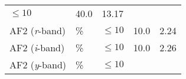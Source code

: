 \documentclass[DM,toc]{lsstdoc}
\begin{document}
\begin{longtable}[]{@{}lllll@{}}
\begin{minipage}[t]{0.20\columnwidth}
\(\leq 10\)\strut
\end{minipage} & \begin{minipage}[t]{0.22\columnwidth}\raggedright\strut
40.0\strut
\end{minipage} & \begin{minipage}[t]{0.17\columnwidth}\raggedright\strut
13.17\strut
\end{minipage}\tabularnewline
\begin{minipage}[t]{0.19\columnwidth}\raggedright\strut
AF2 (\emph{r}-band)\strut
\end{minipage} & \begin{minipage}[t]{0.08\columnwidth}\raggedright\strut
\%\strut
\end{minipage} & \begin{minipage}[t]{0.20\columnwidth}\raggedright\strut
\(\leq 10\)\strut
\end{minipage} & \begin{minipage}[t]{0.22\columnwidth}\raggedright\strut
10.0\strut
\end{minipage} & \begin{minipage}[t]{0.17\columnwidth}\raggedright\strut
2.24\strut
\end{minipage}\tabularnewline
\begin{minipage}[t]{0.19\columnwidth}\raggedright\strut
AF2 (\emph{i}-band)\strut
\end{minipage} & \begin{minipage}[t]{0.08\columnwidth}\raggedright\strut
\%\strut
\end{minipage} & \begin{minipage}[t]{0.20\columnwidth}\raggedright\strut
\(\leq 10\)\strut
\end{minipage} & \begin{minipage}[t]{0.22\columnwidth}\raggedright\strut
10.0\strut
\end{minipage} & \begin{minipage}[t]{0.17\columnwidth}\raggedright\strut
2.26\strut
\end{minipage}\tabularnewline
\begin{minipage}[t]{0.19\columnwidth}\raggedright\strut
AF2 (\emph{y}-band)\strut
\end{minipage} & \begin{minipage}[t]{0.08\columnwidth}\raggedright\strut
\%\strut
\end{minipage} & \begin{minipage}[t]{0.20\columnwidth}\raggedright\strut
\(\leq 10\)\strut
\end{minipage} & \begin{minipage}[t]{0.22\columnwidth}\raggedright\strut

\end{minipage}
\end{longtable}
\end{document}
